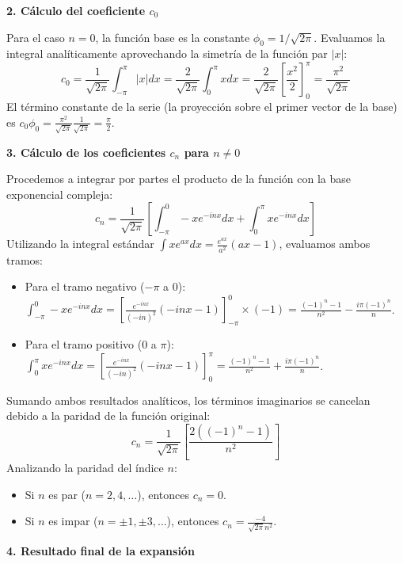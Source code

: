 \documentclass[a4paper]{article}
\begin{document}
\textbf{2. Cálculo del coeficiente $c_0$}

Para el caso $n = 0$, la función base es la constante $\phi_0 = 1/\sqrt{2\pi}$. Evaluamos la integral analíticamente aprovechando la simetría de la función par $|x|$:
\begin{equation}
c_0 = \frac{1}{\sqrt{2\pi}} \int_{-\pi}^{\pi} |x| dx = \frac{2}{\sqrt{2\pi}} \int_{0}^{\pi} x dx = \frac{2}{\sqrt{2\pi}} \left[ \frac{x^2}{2} \right]_0^\pi = \frac{\pi^2}{\sqrt{2\pi}}
\end{equation}
El término constante de la serie (la proyección sobre el primer vector de la base) es $c_0 \phi_0 = \frac{\pi^2}{\sqrt{2\pi}} \frac{1}{\sqrt{2\pi}} = \frac{\pi}{2}$.

\textbf{3. Cálculo de los coeficientes $c_n$ para $n \neq 0$}

Procedemos a integrar por partes el producto de la función con la base exponencial compleja:
\begin{equation}
c_n = \frac{1}{\sqrt{2\pi}} \left[ \int_{-\pi}^0 -x e^{-inx} dx + \int_0^\pi x e^{-inx} dx \right]
\end{equation}
Utilizando la integral estándar $\int x e^{ax} dx = \frac{e^{ax}}{a^2}(ax - 1)$, evaluamos ambos tramos:
\begin{itemize}
    \item Para el tramo negativo ($-\pi$ a $0$): $\int_{-\pi}^0 -x e^{-inx} dx = \left[ \frac{e^{-inx}}{(-in)^2}(-inx - 1) \right]_{-\pi}^0 \times (-1) = \frac{(-1)^n - 1}{n^2} - \frac{i\pi(-1)^n}{n}$.
    \item Para el tramo positivo ($0$ a $\pi$): $\int_0^\pi x e^{-inx} dx = \left[ \frac{e^{-inx}}{(-in)^2}(-inx - 1) \right]_0^\pi = \frac{(-1)^n - 1}{n^2} + \frac{i\pi(-1)^n}{n}$.
\end{itemize}
Sumando ambos resultados analíticos, los términos imaginarios se cancelan debido a la paridad de la función original:
\begin{equation}
c_n = \frac{1}{\sqrt{2\pi}} \left[ \frac{2((-1)^n - 1)}{n^2} \right]
\end{equation}
Analizando la paridad del índice $n$:
\begin{itemize}
    \item Si $n$ es par ($n = 2, 4, \dots$), entonces $c_n = 0$.
    \item Si $n$ es impar ($n = \pm 1, \pm 3, \dots$), entonces $c_n = \frac{-4}{\sqrt{2\pi} n^2}$.
\end{itemize}

\textbf{4. Resultado final de la expansión}
\end{document}
